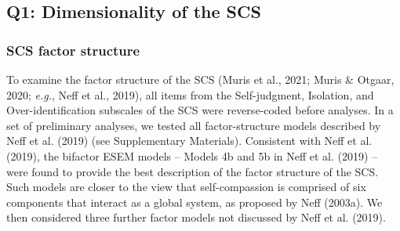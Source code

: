 \documentclass[
  english,
  man,floatsintext]{apa7}
\begin{document}
\hypertarget{q1-dimensionality-of-the-scs}{%
\subsection{Q1: Dimensionality of the SCS}\label{q1-dimensionality-of-the-scs}}

\hypertarget{scs-factor-structure}{%
\subsubsection{SCS factor structure}\label{scs-factor-structure}}

To examine the factor structure of the SCS (Muris et al., 2021; Muris \& Otgaar, 2020; \emph{e.g.}, Neff et al., 2019), all items from the Self-judgment, Isolation, and Over-identification subscales of the SCS were reverse‐coded before analyses. In a set of preliminary analyses, we tested all factor-structure models described by Neff et al. (2019) (see Supplementary Materials). Consistent with Neff et al. (2019), the bifactor ESEM models -- Models 4b and 5b in Neff et al. (2019) -- were found to provide the best description of the factor structure of the SCS. Such models are closer to the view that self-compassion is comprised of six components that interact as a global system, as proposed by Neff (2003a). We then considered three further factor models not discussed by Neff et al. (2019).
\end{document}
